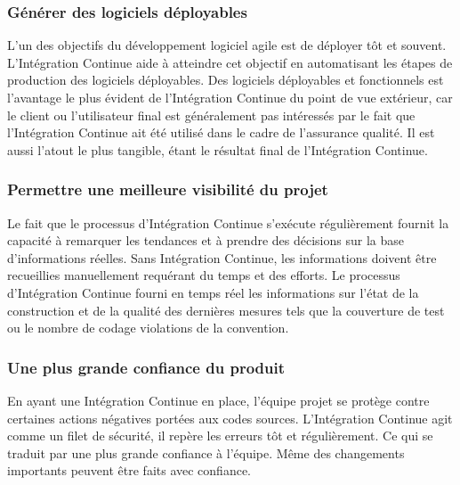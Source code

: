 \documentclass{report}
\begin{document}
        \subsubsection{Générer des logiciels déployables}
        L'un des objectifs du développement logiciel agile est de déployer tôt et souvent. L’Intégration Continue aide à atteindre cet objectif en automatisant les étapes de production des logiciels déployables. Des logiciels déployables et fonctionnels est l'avantage le plus évident de l’Intégration Continue du point de vue extérieur, car le client ou l'utilisateur final est généralement pas intéressés par le fait que l’Intégration Continue ait été utilisé dans le cadre de l'assurance qualité. Il est aussi l'atout le plus tangible, étant le résultat final de l’Intégration Continue.

        \subsubsection{Permettre une meilleure visibilité du projet}
        Le fait que le processus d’Intégration Continue s’exécute régulièrement fournit la capacité à remarquer les tendances et à prendre des décisions sur la base d’informations réelles. Sans Intégration Continue, les informations doivent être recueillies manuellement requérant du temps et des efforts. Le  processus d’Intégration Continue fourni en temps réel les informations sur l'état de la construction et de la qualité des dernières mesures tels que la couverture de test ou le nombre de codage violations de la convention.

        \subsubsection{Une plus grande confiance du produit}
        En ayant une Intégration Continue en place, l'équipe projet se protège contre certaines actions négatives portées aux codes sources. L’Intégration Continue agit comme un filet de sécurité, il repère les erreurs tôt et régulièrement. Ce qui se traduit par une plus grande confiance à l'équipe. Même des changements importants peuvent être faits avec confiance.
\end{document}
